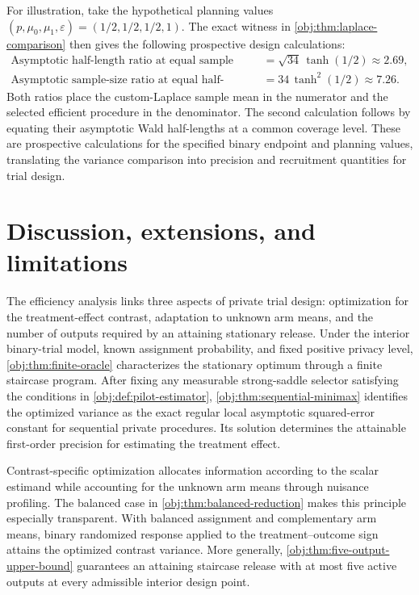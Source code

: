 \documentclass[11pt]{article}
\begin{document}
For illustration, take the hypothetical planning values
\((p,\mu_0,\mu_1,\varepsilon)=(1/2,1/2,1/2,1)\).
The exact witness in \cref{obj:thm:laplace-comparison} then gives the following prospective design calculations:
\[
\begin{aligned}
\text{Asymptotic half-length ratio at equal sample size}
&=\sqrt{34}\,\tanh(1/2)
\approx 2.69,\\
\text{Asymptotic sample-size ratio at equal half-length}
&=34\,\tanh^2(1/2)
\approx 7.26.
\end{aligned}
\]
Both ratios place the custom-Laplace sample mean in the numerator and the selected efficient procedure in the denominator. The second calculation follows by equating their asymptotic Wald half-lengths at a common coverage level. These are prospective calculations for the specified binary endpoint and planning values, translating the variance comparison into precision and recruitment quantities for trial design.


\section{Discussion, extensions, and limitations}

The efficiency analysis links three aspects of private trial design: optimization for the treatment-effect contrast, adaptation to unknown arm means, and the number of outputs required by an attaining stationary release. Under the interior binary-trial model, known assignment probability, and fixed positive privacy level, \cref{obj:thm:finite-oracle} characterizes the stationary optimum through a finite staircase program. After fixing any measurable strong-saddle selector satisfying the conditions in \cref{obj:def:pilot-estimator}, \cref{obj:thm:sequential-minimax} identifies the optimized variance as the exact regular local asymptotic squared-error constant for sequential private procedures. Its solution determines the attainable first-order precision for estimating the treatment effect.

Contrast-specific optimization allocates information according to the scalar estimand while accounting for the unknown arm means through nuisance profiling. The balanced case in \cref{obj:thm:balanced-reduction} makes this principle especially transparent. With balanced assignment and complementary arm means, binary randomized response applied to the treatment--outcome sign attains the optimized contrast variance. More generally, \cref{obj:thm:five-output-upper-bound} guarantees an attaining staircase release with at most five active outputs at every admissible interior design point.
\end{document}
